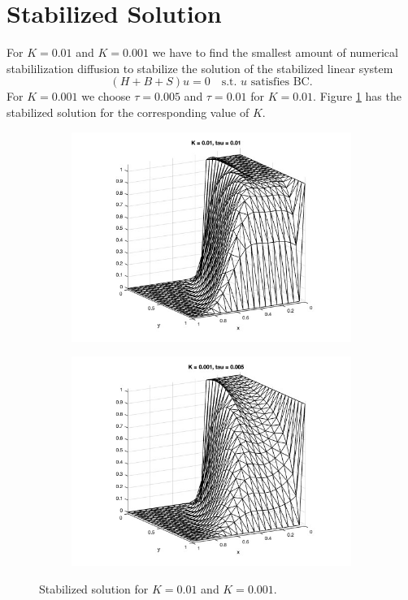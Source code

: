 \documentclass[hidelinks]{article}
\begin{document}
\section{Stabilized Solution}
For $K=0.01$ and $K=0.001$ we have to find the smallest amount of numerical stabililization diffusion to stabilize the solution of the stabilized linear system \[
(H + B + S)u = 0 \quad \text{s.t. $u$ satisfies BC.}
\] For $K=0.001$ we choose $\tau = 0.005$ and $\tau = 0.01$ for $K=0.01$. Figure \ref{fig:stab} has the stabilized solution for the corresponding value of $K$.

\begin{figure}[H]
     \begin{subfigure}[t]{0.45\textwidth}
        \centering
        \includegraphics[width=\textwidth]{pic/k001t001.jpg}
    \end{subfigure}
    \hfill
    \begin{subfigure}[t]{0.45\textwidth}
        \centering
        \includegraphics[width=\textwidth]{pic/k0001t0005.jpg}
    \end{subfigure}
    \caption{Stabilized solution for $K=0.01$ and $K=0.001$.}\label{fig:stab}
\end{figure}
\end{document}
